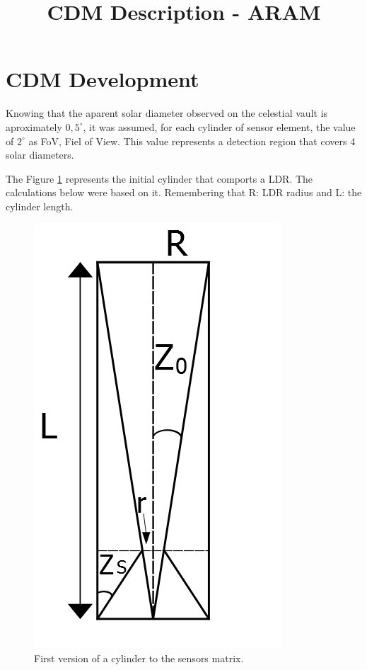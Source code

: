 \documentclass[a4paper,12pt]{article}
\title{CDM Description - ARAM}
\begin{document}
	\maketitle
	\section{CDM Development}
	Knowing that the aparent solar diameter observed on the celestial vault is aproximately $0,5^{\circ}$, it was assumed, for each cylinder of sensor element, the value of $2^{\circ}$ as  FoV, Fiel of View. This value represents a detection region that covers 4 solar diameters. 
	
	The Figure \ref{Fig:MCD_1} represents the initial cylinder that comports a LDR. The calculations below were based on it. Remembering that R: LDR radius and L: the cylinder length.

\begin{figure}[htb] 
	\centering
	\includegraphics[scale=0.5]{img/MCD_1.jpg}
	\caption{First version of a cylinder to the sensors matrix.}
	\label{Fig:MCD_1}
\end{figure}
\end{document}
